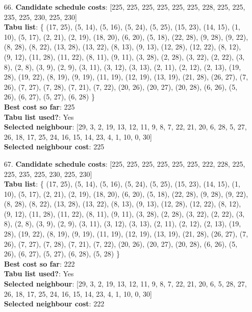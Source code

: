 \documentclass[fleqn]{article}
\begin{document}
\begin{itemize}
    \item[66.] \textbf{Candidate schedule costs}: [225, 225, 225, 225, 225, 225, 228, 225, 225, 235, 225, 230, 225, 230] \\
    \textbf{Tabu list}: \{ (17, 25), (5, 14), (5, 16), (5, 24), (5, 25), (15, 23), (14, 15), (1, 10), (5, 17), (2, 21), (2, 19), (18, 20), (6, 20), (5, 18), (22, 28), (9, 28), (9, 22), (8, 28), (8, 22), (13, 28), (13, 22), (8, 13), (9, 13), (12, 28), (12, 22), (8, 12), (9, 12), (11, 28), (11, 22), (8, 11), (9, 11), (3, 28), (2, 28), (3, 22), (2, 22), (3, 8), (2, 8), (3, 9), (2, 9), (3, 11), (3, 12), (3, 13), (2, 11), (2, 12), (2, 13), (19, 28), (19, 22), (8, 19), (9, 19), (11, 19), (12, 19), (13, 19), (21, 28), (26, 27), (7, 26), (7, 27), (7, 28), (7, 21), (7, 22), (20, 26), (20, 27), (20, 28), (6, 26), (5, 26), (6, 27), (5, 27), (6, 28) \} \\
    \textbf{Best cost so far}: 225 \\
    \textbf{Tabu list used?}: Yes \\
    \textbf{Selected neighbour}: [29, 3, 2, 19, 13, 12, 11, 9, 8, 7, 22, 21, 20, 6, 28, 5, 27, 26, 18, 17, 25, 24, 16, 15, 14, 23, 4, 1, 10, 0, 30] \\
    \textbf{Selected neighbour cost}: 225
      

    \item[67.] \textbf{Candidate schedule costs}: [225, 225, 225, 225, 225, 225, 222, 228, 225, 225, 235, 225, 230, 225, 230] \\
    \textbf{Tabu list}: \{ (17, 25), (5, 14), (5, 16), (5, 24), (5, 25), (15, 23), (14, 15), (1, 10), (5, 17), (2, 21), (2, 19), (18, 20), (6, 20), (5, 18), (22, 28), (9, 28), (9, 22), (8, 28), (8, 22), (13, 28), (13, 22), (8, 13), (9, 13), (12, 28), (12, 22), (8, 12), (9, 12), (11, 28), (11, 22), (8, 11), (9, 11), (3, 28), (2, 28), (3, 22), (2, 22), (3, 8), (2, 8), (3, 9), (2, 9), (3, 11), (3, 12), (3, 13), (2, 11), (2, 12), (2, 13), (19, 28), (19, 22), (8, 19), (9, 19), (11, 19), (12, 19), (13, 19), (21, 28), (26, 27), (7, 26), (7, 27), (7, 28), (7, 21), (7, 22), (20, 26), (20, 27), (20, 28), (6, 26), (5, 26), (6, 27), (5, 27), (6, 28), (5, 28) \} \\
    \textbf{Best cost so far}: 222 \\
    \textbf{Tabu list used?}: Yes \\
    \textbf{Selected neighbour}: [29, 3, 2, 19, 13, 12, 11, 9, 8, 7, 22, 21, 20, 6, 5, 28, 27, 26, 18, 17, 25, 24, 16, 15, 14, 23, 4, 1, 10, 0, 30] \\
    \textbf{Selected neighbour cost}: 222
      


\end{itemize}
\end{document}
